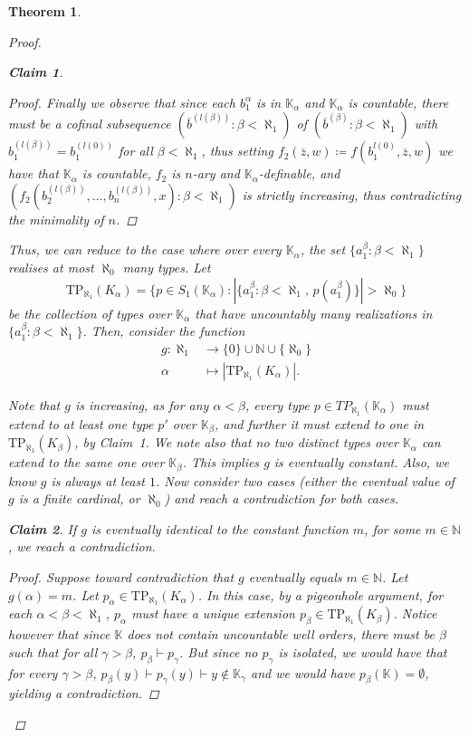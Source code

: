\documentclass{amsart}
\newtheorem{theorem}{Theorem}
\newtheorem{claim}{Claim}[theorem]
\theoremstyle{remark}
\theoremstyle{definition}
\theoremstyle{plain}
\newcommand{\bK}{\mathbb K}
\newcommand{\bN}{\mathbb N}
\theoremstyle{plain}
\begin{document}
\begin{theorem}
\begin{proof}
\begin{claim}
\begin{proof}
                Finally we observe that since each $b_1^{\alpha}$ is in $\bK_\alpha$ and $\bK_\alpha$ is countable, there must be a cofinal subsequence $(\overline{b}^{(l(\beta))}:\beta<\aleph_1)$ of $(\overline{b}^{(\beta)}:\beta<\aleph_1)$ with $b_1^{(l(\beta))}=b_1^{(l(0))}$ for all $\beta<\aleph_1$, thus setting $f_2(\overline{z},w)\coloneqq f(b_1^{l(0)}, \overline{z},w)$ we have that $\bK_\alpha$ is countable, $f_2$ is $n$-ary and $\bK_\alpha$-definable, and $(f_2(b_2^{(l(\beta))}, \ldots, b_n^{(l(\beta))}, x):\beta<\aleph_1)$ is strictly increasing, thus contradicting the minimality of $n$.
            \end{proof}
        \end{claim}

        \newcommand{\TP}{\mathrm{TP}}
        Thus, we can reduce to the case where over every $\bK_\alpha$, the set $\{a_1^{\beta}:\beta<\aleph_1\}$ realises at most $\aleph_0$ many types.
        Let 
        \[\TP_{\aleph_1}(K_\alpha)=\big\{p \in S_1(\bK_\alpha): |\{a_1^\beta: \beta < \aleph_1,\, p(a_1^\beta)\}|>\aleph_0\big\}\]
        be the collection of types over $\bK_\alpha$ that have uncountably many realizations in $\{a_1^\beta: \beta < \aleph_1\}$. 
        Then, consider the function
        \begin{align*}
        g : \aleph_1 &\rightarrow \{0\} \cup \mathbb{N} \cup \{\aleph_0\}\\
        \alpha &\mapsto |\TP_{\aleph_1}(K_\alpha)|.
        \end{align*}
    
        Note that $g$ is increasing, as for any $\alpha<\beta$, every type $p \in TP_{\aleph_1}(\bK_\alpha)$ must extend to at least one type $p'$ over $\bK_{\beta}$, and further it must extend to one in $\TP_{\aleph_1}(K_\beta)$, by Claim~1. We note also that no two distinct types over $\bK_\alpha$ can extend to the same one over $\bK_\beta$. This implies $g$ is eventually constant. Also, we know $g$ is always at least $1$. Now consider two cases (either the eventual value of $g$ is a finite cardinal, or $\aleph_0$) and reach a contradiction for both cases.

        \begin{claim}
        If $g$ is eventually identical to the constant function $m$, for some $m \in \mathbb{N}$, we reach a contradiction.
        \end{claim}
        \begin{proof}
            Suppose toward contradiction that $g$ eventually equals $m \in \bN$. Let $g(\alpha) = m$. Let $p_\alpha \in \TP_{\aleph_1}(K_\alpha)$.
            In this case, by a pigeonhole argument, for each $\alpha<\beta < \aleph_1$, $p_\alpha$ must have a unique extension $p_\beta \in \TP_{\aleph_1}(K_\beta)$. Notice however that since $\bK$ does not contain uncountable well orders, there must be $\beta$ such that for all $\gamma>\beta$, $p_\beta \vdash p_\gamma$. But since no $p_\gamma$ is isolated, we would have that for every $\gamma>\beta$,  $p_\beta(y) \vdash p_\gamma(y) \vdash y \notin \bK_\gamma$ and we would have $p_\beta (\bK)=\emptyset$, yielding a contradiction.
        \end{proof}


\end{proof}
\end{theorem}
\end{document}
